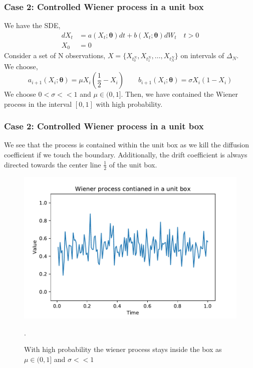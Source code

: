 \documentclass[aspectratio=169]{beamer}\usepackage[utf8]{inputenc}
\begin{document}
\begin{frame}\frametitle{Case 2: Controlled Wiener process in a unit box }
We have the SDE,
\begin{equation}
\begin{split}
dX_t &= a(X_t; \bm{\theta}) dt + b (X_t; \bm{\theta} ) dW_t \quad t > 0 \\
X_0 & = 0
\end{split}\label{main}
\end{equation}
Consider a set of N observations, $X= \{ X_{t_0^N} , X_{t_1^N} ,\ldots , X_{t_N^N} \}$ on intervals of $\Delta_N$.\\ We choose,
\begin{equation}
a_{i+1}(X_i; \bm{\theta})= \mu X_i(\frac{1}{2} - X_i)  \quad \quad b_{i+1} (X_i; \bm{\theta} )=\sigma X_i (1-X_i)
\end{equation}
We choose $ 0<\sigma <<1$ and $\mu\in (0,1]$. Then, we have contained the Wiener process in the interval $[0,1]$ with high probability.

\end{frame}


\begin{frame}\frametitle{Case 2: Controlled Wiener process in a unit box }
We see that the process is contained within the unit box as we kill the diffusion coefficient if we touch the boundary. Additionally, the drift coefficient is always directed towards the center line $\frac{1}{2}$ of the unit box.
\begin{figure}
  \includegraphics[scale=0.45]{Figures/Wiener_box.pdf}
  \caption{ With  high probability the wiener process stays inside the box as $\mu \in (0,1]$ and $\sigma << 1$ }.
\end{figure}

\end{frame}
\end{document}
